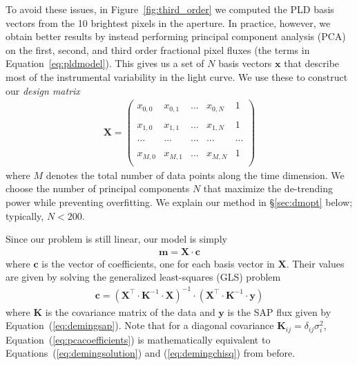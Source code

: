 \documentclass[]{emulateapj}
\begin{document}
To avoid these issues, in Figure~\ref{fig:third_order} we computed the PLD basis vectors from
the 10 brightest pixels in the aperture. In practice, however, we obtain better results
by instead performing principal component analysis (PCA) on the first,
second, and third order fractional pixel fluxes (the terms in Equation~\ref{eq:pldmodel}).
This gives us a set of $N$ basis vectors $\mathbf{x}$ that describe most of the instrumental
variability in the light curve. We use these to construct our \emph{design matrix} 
\begin{align}
\label{eq:designmatrix}
\mathbf{X} =  \begin{pmatrix}
              x_{0,0} & x_{0,1} & ... & x_{0,N} & 1\\
              \\
              x_{1,0} & x_{1,1} & ... & x_{1,N} & 1\\
              \\
              ... & ... & ... & ... & ...\\
              \\
              x_{M,0} & x_{M,1} & ... & x_{M,N} & 1\\
              \end{pmatrix}
\end{align}
where $M$ denotes the total number of data points along the time dimension. We choose
the number of principal components $N$ that maximize the de-trending power while preventing
overfitting. We explain our method in \S\ref{sec:dmopt} below; typically, $N < 200$.

Since our problem is still linear, our model is simply
\begin{align}
\label{eq:pcamodel}
\mathbf{m} = \mathbf{X} \cdot \mathbf{c}
\end{align}
where $\mathbf{c}$ is the vector of coefficients, one for each basis vector in $\mathbf{X}$.
Their values are given by solving the generalized least-squares (GLS) problem
\begin{align}
\label{eq:pcacoefficients}
\mathbf{c} = \left(\mathbf{X}^\top \cdot \mathbf{K}^{-1} \cdot \mathbf{X}\right)^{-1} \cdot \left(\mathbf{X}^\top \cdot \mathbf{K}^{-1} \cdot \mathbf{y}\right)
\end{align}
where $\mathbf{K}$ is the covariance matrix of the data and $\mathbf{y}$ is the
SAP flux given by Equation~(\ref{eq:demingsap}). Note that for a diagonal covariance
$\mathbf{K}_{ij} = \delta_{ij}\sigma_i^2$, Equation~(\ref{eq:pcacoefficients}) is
mathematically equivalent to Equations~(\ref{eq:demingsolution}) and 
(\ref{eq:demingchisq}) from before.
\end{document}
